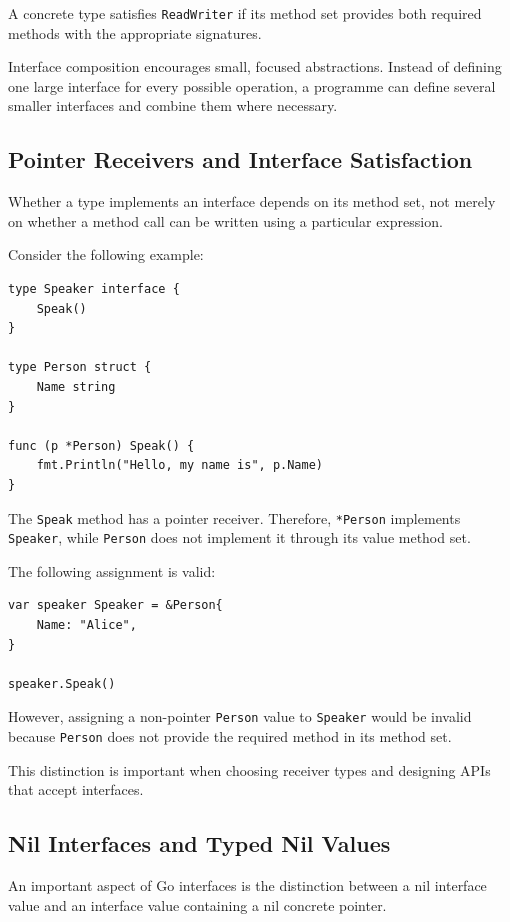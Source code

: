 A concrete type satisfies \texttt{ReadWriter} if its method set provides both required methods with the appropriate signatures.

Interface composition encourages small, focused abstractions. Instead of defining one large interface for every possible operation, a programme can define several smaller interfaces and combine them where necessary.

\subsection{Pointer Receivers and Interface Satisfaction}

Whether a type implements an interface depends on its method set, not merely on whether a method call can be written using a particular expression.

Consider the following example:

\begin{lstlisting}
type Speaker interface {
    Speak()
}

type Person struct {
    Name string
}

func (p *Person) Speak() {
    fmt.Println("Hello, my name is", p.Name)
}
\end{lstlisting}

The \texttt{Speak} method has a pointer receiver. Therefore, \texttt{*Person} implements \texttt{Speaker}, while \texttt{Person} does not implement it through its value method set.

The following assignment is valid:

\begin{lstlisting}
var speaker Speaker = &Person{
    Name: "Alice",
}

speaker.Speak()
\end{lstlisting}

However, assigning a non-pointer \texttt{Person} value to \texttt{Speaker} would be invalid because \texttt{Person} does not provide the required method in its method set.

This distinction is important when choosing receiver types and designing APIs that accept interfaces.

\subsection{Nil Interfaces and Typed Nil Values}

An important aspect of Go interfaces is the distinction between a nil interface value and an interface value containing a nil concrete pointer.

